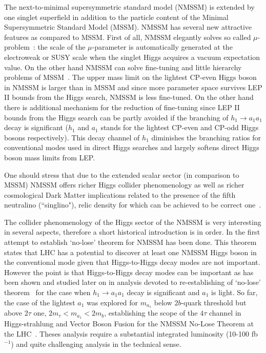 \documentclass[aps,prl,twocolumn,nofootinbib,superscriptaddress]{revtex4}
\begin{document}
The next-to-minimal supersymmetric standard model (NMSSM)
\cite{Nilles:1982dy,Frere:1983ag,Ellis:1988er,%
Drees:1988fc,Ellwanger:1993hn,Ellwanger:1993xa,%
Elliott:1993bs,Pandita:1993tg,Ellwanger:1995ru,%
King:1995vk,Franke:1995tc,Ellwanger:1996gw,Miller:2003ay}
is extended by one singlet superfield in addition to the particle content
of the Minimal Supersymmetric Standard Model (MSSM).
NMSSM has several new attractive features as compared to MSSM.
First  of all, NMSSM elegantly solves so called $\mu$-problem~\cite{mu-problem}:
the scale of the $\mu$-parameter is automatically generated 
at the electroweak or SUSY  scale when the singlet Higgs acquires 
a vacuum expectation value.
On the other hand NMSSM can solve fine-tuning and little hierarchy problems
of MSSM~\cite{Dermisek:2005ar}.
The upper mass limit on the lightest  CP-even
Higgs boson in NMSSM is larger than in MSSM and since more
parameter space survives LEP II bounds from the Higgs search,  NMSSM
is less fine-tuned.
On the other hand  there is additional mechanism for the reduction of
fine-tuning since 
LEP II bounds from the Higgs search can be partly avoided if the
branching of  $h_1\to a_1 a_1$ decay is significant ($h_1$ and
$a_1$ stands for the lightest   CP-even  and CP-odd Higgs bosons respectively).
This decay channel of $h_1$ diminishes the branching ratios for
conventional modes used in direct Higgs  searches and largely softens
direct Higgs boson mass limits from LEP. 

One should stress that due to the extended scalar sector (in comparison to MSSM)
NMSSM offers richer Higgs collider phenomenology
\cite{nmssm-ph1,nmssm-ph2,%
nmssm-ph2b,nmssm-ph3,nmssm-ph4,%
nmssm-ph5,nmssm-ph6,nmssm-ph6a,nmssm-ph7}
as well as richer  cosmological Dark Matter implications 
related to the presence of the fifth  neutralino (``singlino"),
relic density for  which can be achieved to be correct one~\cite{nmssm-dm}.

The collider phenomenology of the Higgs sector of the NMSSM
is very interesting in several aspects, therefore a short historical 
introduction is in  order.
In \cite{nmssm-ph2} the first attempt to establish `no-lose' theorem for NMSSM
has been done. This theorem states that LHC has a potential to discover at least one
NMSSM Higgs boson in the conventional mode given that Higgs-to-Higgs decay modes 
are not important. However the point is that  Higgs-to-Higgs decay modes
can be important as has been shown and studied later on
in analysis devoted to re-establishing   of `no-lose' 
theorem~\cite{nmssm-ph2b,nmssm-ph3,nmssm-ph4,nmssm-ph5,nmssm-ph6,nmssm-ph6a,nmssm-ph7}
for the case when  $h_1\to a_1 a_1$ decay is significant
and $a_1$ is light. So far, the case of the lightest $a_1$  was explored 
for $m_{a_1}$ below $2b$-quark threshold but above $2\tau$ one,
$2m_\tau <m_{a_1}<2m_b$, establishing the scope of
the $4\tau$ channel in Higgs-strahlung and Vector Boson Fusion
for the NMSSM No-Lose Theorem at the LHC~\cite{nmssm-ph7}.
Theses analysis  require a substantial integrated luminosity (10-100 fb$^{-1}$)
and quite challenging analysis in the technical sense.
\end{document}
